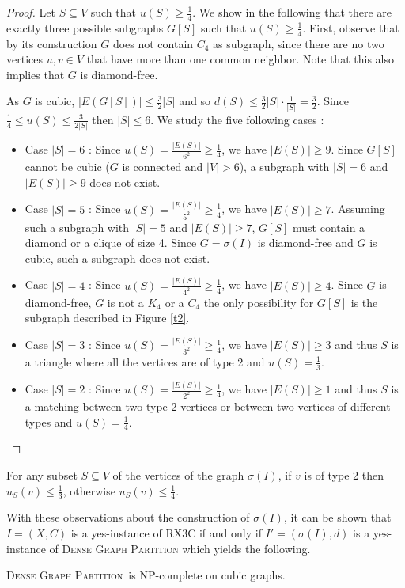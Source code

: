 \documentclass[a4paper,USenglish,cleveref, autoref]{lipics-v2021}
\newcommand\DGP{\textsc{Dense Graph Partition}}
\begin{document}
\begin{proof}
Let $S\subseteq V$ such that $u(S) \geq \frac{1}{4}$. We show in the following that there are exactly three possible  subgraphs $G[S]$ such that  $u(S) \geq \frac{1}{4}$. 
First, observe that by its construction $G$ does not contain $C_4$ as subgraph, since there are no two vertices $u,v\in V$ that have more than one common neighbor. Note that this also implies that $G$ is diamond-free.

As $G$ is cubic, $|E(G[S])| \leq \frac{3}{2}|S|$ and  so $d(S) \leq \frac{3}{2}|S|\cdot \frac{1}{|S|} = \frac{3}{2}$. Since $\frac{1}{4} \leq u(S) \leq \frac{3}{2|S|}$  then $|S| \leq 6$. We study the five following cases :
\begin{itemize}
    \item Case $|S| = 6$ : Since $u(S)= \frac{|E(S)|}{6^2}  \geq \frac{1}{4}$,  we have $|E(S)| \geq 9$. Since $G[S]$ cannot be cubic ($G$ is connected and $|V| > 6$), a subgraph with $|S|=6$ and $|E(S)| \geq 9$ does not exist.
    \item Case $|S| = 5$ : Since $u(S)= \frac{|E(S)|}{5^2} \geq \frac{1}{4}$,  we have $|E(S)| \geq 7$. Assuming such a subgraph with $|S| = 5$ and $|E(S)| \geq 7$, $G[S]$ must contain a diamond or a clique of size 4. Since $G=\sigma(I)$ is diamond-free and $G$ is cubic, such a  subgraph does not exist.
    \item Case $|S| = 4$ : Since $u(S)= \frac{|E(S)|}{4^2} \geq \frac{1}{4}$,  we have $|E(S)| \geq 4$.    Since $G$ is diamond-free, $G$ is not a $K_4$ or a $C_4$  the only possibility for $G[S]$ is the subgraph described in Figure \ref{t2}.
    \item Case $|S| = 3$ : Since $u(S) = \frac{|E(S)|}{3^2} \geq \frac{1}{4}$,  we have $|E(S)| \geq 3$ and thus $S$ is a triangle where all the vertices are of type 2 and $u(S) = \frac{1}{3}$.
    \item Case $|S| = 2$ : Since $u(S) = \frac{|E(S)|}{2^2}  \geq  \frac{1}{4}$, we have $|E(S)| \geq 1$ and thus $S$ is a matching between two  type 2 vertices or between two vertices of different types and $u(S) = \frac{1}{4}$.
\end{itemize}
\end{proof}


\begin{remark}
For any subset $S\subseteq V$ of the vertices of the graph $\sigma(I)$, if $v$ is of type 2 then $u_S(v) \leq \frac{1}{3}$, otherwise $u_S(v) \leq \frac{1}{4}$.
\end{remark}
With these observations about the construction of $\sigma(I)$, it can be shown that $I=(X,C)$ is a yes-instance of RX3C if and only if $I'=(\sigma(I),d)$ is a yes-instance of \DGP{} which yields the following.
\begin{theorem}\label{cubichardness}
\DGP~is NP-complete on cubic graphs.
\end{theorem}
\end{document}
